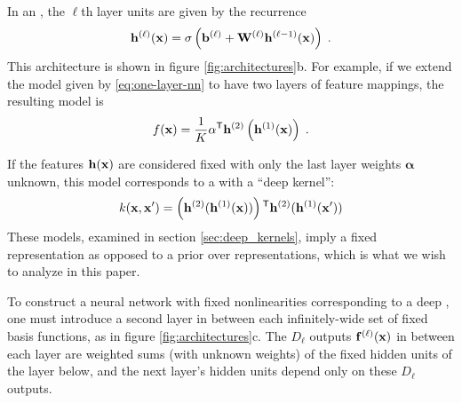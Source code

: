 \documentclass[twoside]{article}
\makeatletter
\newlength{\nonHumbleHeight}
\def\@humbleformat#1{{\settoheight{\nonHumbleHeight}{#1}\resizebox{!}{0.94\nonHumbleHeight}{#1}}}%
\newcommand\humble[1]{{\@humbleformat{#1}}}%
\newcommand{\gp}{{\humble{GP}}}
\newcommand{\MLP}{{\humble{MLP}}}
\newcommand{\hphi}{h}
\newcommand{\hPhi}{\vh}
\newcommand{\layerindex}{\ell}
\makeatother
\begin{document}
In an \MLP{}, the $\layerindex$th layer units are given by the recurrence
%
\begin{align}
\vh^{(\layerindex)}(\vx) = \sigma \left( \vb^{(\layerindex)} + \vW^{(\layerindex)} \vh^{(\layerindex-1)}(\vx) \right) \;.
\label{eq:nextlayer}
\end{align}
This architecture is shown in figure \ref{fig:architectures}b. 
%
For example, if we extend the model given by \eqref{eq:one-layer-nn} to have two layers of feature mappings,  the resulting model is
%
\begin{align}
f(\vx) = \frac{1}{K}{\mathbf \alpha}\tra \hPhi^{(2)}\left( \hPhi^{(1)}(\vx) \right) \;.
\label{eq:mutli-layer-nn}
\end{align}

If the features ${\bf{h}}({\bf{x}})$ are considered fixed with only the last layer weights ${\mathbf \alpha}$ unknown, this model corresponds to a \gp{} with a ``deep kernel'': 
\begin{align}
k(\vx, \vx') = \left( \hPhi^{(2)} ( \hPhi^{(1)}(\vx) ) \right) \tra \hPhi^{(2)} (\hPhi^{(1)}(\vx') )
\end{align}
These models, examined in section \ref{sec:deep_kernels}, imply a fixed representation as opposed to a prior over representations, which is what we wish to analyze in this paper.


 

To construct a neural network with fixed nonlinearities corresponding to a deep \gp{}, 
one must introduce a second layer in between each infinitely-wide set of fixed basis functions, as in figure \ref{fig:architectures}c.
The $D_\layerindex$ outputs $\vf^{(\layerindex)}(\vx)$ in between each layer are weighted sums (with unknown weights) of the fixed hidden units of the layer below, and the next layer's hidden units depend only on these $D_\layerindex$ outputs.
%
\end{document}
